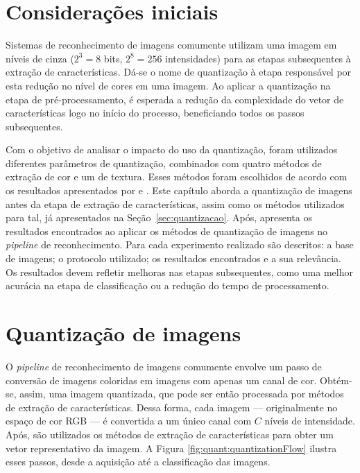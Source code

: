 \section{Considerações iniciais}

Sistemas de reconhecimento de imagens comumente utilizam uma imagem em níveis de cinza ($2^3 = 8$ bits, $2^8 = 256$ intensidades) para as etapas subsequentes à extração de características. Dá-se o nome de quantização à etapa responsável por esta redução no nível de cores em uma imagem. Ao aplicar a quantização na etapa de pré-processamento, é esperada a redução da complexidade do vetor de características logo no início do processo, beneficiando todos os passos subsequentes.

Com o objetivo de analisar o impacto do uso da quantização, foram utilizados diferentes parâmetros de quantização, combinados com quatro métodos de extração de cor e um de textura. Esses métodos foram escolhidos de acordo com os resultados apresentados por  e . Este capítulo aborda a quantização de imagens antes da etapa de extração de características, assim como os métodos utilizados para tal, já apresentados na Seção~\ref{sec:quantizacao}. Após, apresenta os resultados encontrados ao aplicar os métodos de quantização de imagens no \textit{pipeline} de reconhecimento. Para cada experimento realizado são descritos: a base de imagens; o protocolo utilizado; os resultados encontrados e a sua relevância. Os resultados devem refletir melhoras nas etapas subsequentes, como uma melhor acurácia na etapa de classificação ou a redução do tempo de processamento.


\section{Quantização de imagens}

O \textit{pipeline}  de reconhecimento de imagens comumente envolve um passo de conversão de imagens coloridas em imagens com apenas um canal de cor. Obtém-se, assim, uma imagem quantizada, que pode ser então processada por métodos de extração de características. Dessa forma, cada imagem --- originalmente no espaço de cor RGB --- é convertida a um único canal com $C$ níveis de intensidade. Após, são utilizados os métodos de extração de características para obter um vetor representativo da imagem. A Figura \ref{fig:quant:quantizationFlow} ilustra esses passos, desde a aquisição até a classificação das imagens.

